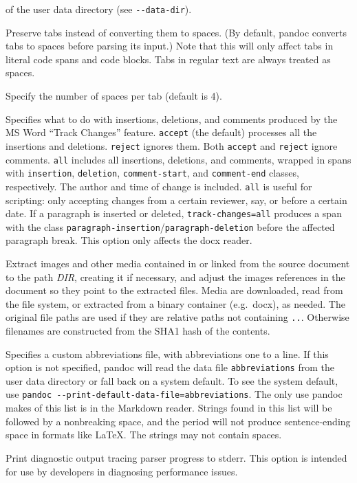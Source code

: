 \documentclass[
  a4paper,
]{article}
\begin{document}
\begin{description}
of the user data directory (see \texttt{-\/-data-dir}).
\item[\texttt{-p}, \texttt{-\/-preserve-tabs{[}=true\textbar{}false{]}}]
Preserve tabs instead of converting them to spaces. (By default, pandoc
converts tabs to spaces before parsing its input.) Note that this will
only affect tabs in literal code spans and code blocks. Tabs in regular
text are always treated as spaces.
\item[\texttt{-\/-tab-stop=}\emph{NUMBER}]
Specify the number of spaces per tab (default is 4).
\item[\texttt{-\/-track-changes=accept}\textbar{}\texttt{reject}\textbar{}\texttt{all}]
Specifies what to do with insertions, deletions, and comments produced
by the MS Word ``Track Changes'' feature. \texttt{accept} (the default)
processes all the insertions and deletions. \texttt{reject} ignores
them. Both \texttt{accept} and \texttt{reject} ignore comments.
\texttt{all} includes all insertions, deletions, and comments, wrapped
in spans with \texttt{insertion}, \texttt{deletion},
\texttt{comment-start}, and \texttt{comment-end} classes, respectively.
The author and time of change is included. \texttt{all} is useful for
scripting: only accepting changes from a certain reviewer, say, or
before a certain date. If a paragraph is inserted or deleted,
\texttt{track-changes=all} produces a span with the class
\texttt{paragraph-insertion}/\texttt{paragraph-deletion} before the
affected paragraph break. This option only affects the docx reader.
\item[\texttt{-\/-extract-media=}\emph{DIR}]
Extract images and other media contained in or linked from the source
document to the path \emph{DIR}, creating it if necessary, and adjust
the images references in the document so they point to the extracted
files. Media are downloaded, read from the file system, or extracted
from a binary container (e.g.~docx), as needed. The original file paths
are used if they are relative paths not containing \texttt{..}.
Otherwise filenames are constructed from the SHA1 hash of the contents.
\item[\texttt{-\/-abbreviations=}\emph{FILE}]
Specifies a custom abbreviations file, with abbreviations one to a line.
If this option is not specified, pandoc will read the data file
\texttt{abbreviations} from the user data directory or fall back on a
system default. To see the system default, use
\texttt{pandoc\ -\/-print-default-data-file=abbreviations}. The only use
pandoc makes of this list is in the Markdown reader. Strings found in
this list will be followed by a nonbreaking space, and the period will
not produce sentence-ending space in formats like LaTeX. The strings may
not contain spaces.
\item[\texttt{-\/-trace{[}=true\textbar{}false{]}}]
Print diagnostic output tracing parser progress to stderr. This option
is intended for use by developers in diagnosing performance issues.
\end{description}
\end{document}
